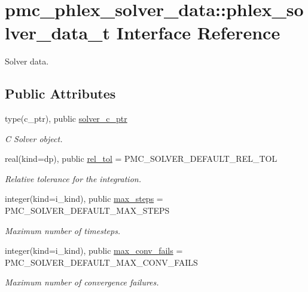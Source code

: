 \hypertarget{structpmc__phlex__solver__data_1_1phlex__solver__data__t}{}\section{pmc\+\_\+phlex\+\_\+solver\+\_\+data\+:\+:phlex\+\_\+solver\+\_\+data\+\_\+t Interface Reference}
\label{structpmc__phlex__solver__data_1_1phlex__solver__data__t}


Solver data.  


\subsection*{Public Attributes}
\begin{DoxyCompactItemize}
\item 
type(c\+\_\+ptr), public \mbox{\hyperlink{structpmc__phlex__solver__data_1_1phlex__solver__data__t_af354fd0908e66c37d49ca12139abe5be}{solver\+\_\+c\+\_\+ptr}}
\begin{DoxyCompactList}\small\item\em C Solver object. \end{DoxyCompactList}\item 
real(kind=dp), public \mbox{\hyperlink{structpmc__phlex__solver__data_1_1phlex__solver__data__t_a3bf99107bb62750ef6575e0046111030}{rel\+\_\+tol}} = P\+M\+C\+\_\+\+S\+O\+L\+V\+E\+R\+\_\+\+D\+E\+F\+A\+U\+L\+T\+\_\+\+R\+E\+L\+\_\+\+T\+OL
\begin{DoxyCompactList}\small\item\em Relative tolerance for the integration. \end{DoxyCompactList}\item 
integer(kind=i\+\_\+kind), public \mbox{\hyperlink{structpmc__phlex__solver__data_1_1phlex__solver__data__t_ad87742649973f065423d1a4cc420bdc0}{max\+\_\+steps}} = P\+M\+C\+\_\+\+S\+O\+L\+V\+E\+R\+\_\+\+D\+E\+F\+A\+U\+L\+T\+\_\+\+M\+A\+X\+\_\+\+S\+T\+E\+PS
\begin{DoxyCompactList}\small\item\em Maximum number of timesteps. \end{DoxyCompactList}\item 
integer(kind=i\+\_\+kind), public \mbox{\hyperlink{structpmc__phlex__solver__data_1_1phlex__solver__data__t_a0cee9fbd20da092d5304d76fd1ab78f2}{max\+\_\+conv\+\_\+fails}} = P\+M\+C\+\_\+\+S\+O\+L\+V\+E\+R\+\_\+\+D\+E\+F\+A\+U\+L\+T\+\_\+\+M\+A\+X\+\_\+\+C\+O\+N\+V\+\_\+\+F\+A\+I\+LS
\begin{DoxyCompactList}\small\item\em Maximum number of convergence failures. \end{DoxyCompactList}\end{DoxyCompactItemize}
